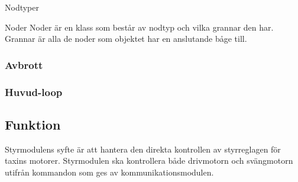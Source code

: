 \documentclass[designspec/spec.tex]{subfiles}
\begin{document}
\begin{labeling}{Nodtyper}

\item [Noder] 
Noder är en klass som består av nodtyp och vilka grannar den har. Grannar är
alla de noder som objektet har en anslutande båge till.

\end{labeling}

\subsubsection{Avbrott}

\subsubsection{Huvud-loop}

\subsection{Funktion}
Styrmodulens syfte är att hantera den direkta kontrollen av styrreglagen för
taxins motorer. Styrmodulen ska kontrollera både drivmotorn och svängmotorn
utifrån kommandon som ges av kommunikationsmodulen.
\end{document}
